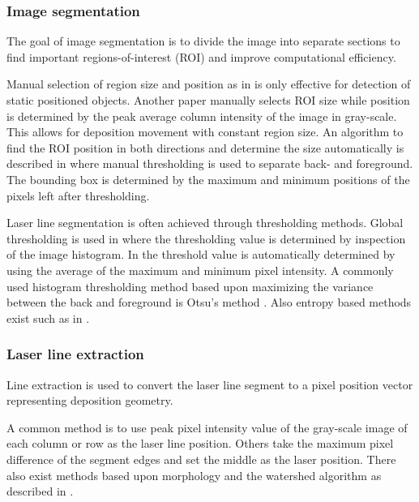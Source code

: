 \subsubsection*{Image segmentation}
The goal of image segmentation is to divide the image into separate sections to find important regions-of-interest (ROI) and improve computational efficiency. 

Manual selection of region size and position as in \cite{huang2012development} is only effective for detection of static positioned objects. Another paper \cite{wang2014weld} manually selects ROI size while position is determined by the peak average column intensity of the image in gray-scale. This allows for deposition movement with constant region size. An algorithm to find the ROI position in both directions and determine the size automatically is described in \cite{xu2004features} where manual thresholding is used to separate back- and foreground. The bounding box is determined by the maximum and minimum positions of the pixels left after thresholding. 

Laser line segmentation is often achieved through thresholding methods. Global thresholding is used in \cite{zhang2007vision} where the thresholding value is determined by inspection of the image histogram. In \cite{wang2014weld} the threshold value is automatically determined by using the average of the maximum and minimum pixel intensity. A commonly used histogram thresholding method based upon maximizing the variance between the back and foreground is Otsu's method \cite{otsu1979threshold}. Also entropy based methods exist such as in \cite{liu2006image}.

\subsubsection*{Laser line extraction}
Line extraction is used to convert the laser line segment to a pixel position vector representing deposition geometry. 

A common method  \cite{nguyen2014laser} \cite{kim1995robust} \cite{li2010measurement} \cite{huang2012development} is to use peak pixel intensity value of the gray-scale image of each column or row as the laser line position. Others \cite{davis2011vision} \cite{xu2004features} \cite{zhang2007vision} take the maximum pixel difference of the segment edges and set the middle as the laser position. There also exist methods based upon morphology and the watershed algorithm as described in \cite{li2007recent}.

